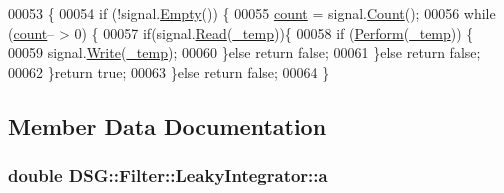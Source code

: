 \begin{DoxyCode}
00053                                                                           \{
00054             \textcolor{keywordflow}{if} (!signal.\hyperlink{class_d_s_g_1_1_ring_buffer_ac1346f5842d08b988a5297abe4089b96}{Empty}()) \{
00055                 \hyperlink{class_d_s_g_1_1_filter_1_1_filter_base_a74068413169f9acb3fcf8276074e3b1d}{count} = signal.\hyperlink{class_d_s_g_1_1_ring_buffer_a9bd79b0a6dff618b205e396c101ee070}{Count}();
00056                 \textcolor{keywordflow}{while} (\hyperlink{class_d_s_g_1_1_filter_1_1_filter_base_a74068413169f9acb3fcf8276074e3b1d}{count}-- > 0) \{
00057                     \textcolor{keywordflow}{if}(signal.\hyperlink{class_d_s_g_1_1_ring_buffer_a6b2848a64f15c7b0c320779582fa0fbe}{Read}(\hyperlink{class_d_s_g_1_1_filter_1_1_filter_base_a9e21e909fa2989adb88eedcb194e0150}{\_temp}))\{
00058                         \textcolor{keywordflow}{if} (\hyperlink{class_d_s_g_1_1_filter_1_1_leaky_integrator_a14ffd2f68de0cb9941d3295307ef13f0}{Perform}(\hyperlink{class_d_s_g_1_1_filter_1_1_filter_base_a9e21e909fa2989adb88eedcb194e0150}{\_temp})) \{
00059                             signal.\hyperlink{class_d_s_g_1_1_ring_buffer_aa5dd2caa0a270173251faee40a43d692}{Write}(\hyperlink{class_d_s_g_1_1_filter_1_1_filter_base_a9e21e909fa2989adb88eedcb194e0150}{\_temp});
00060                         \}\textcolor{keywordflow}{else} \textcolor{keywordflow}{return} \textcolor{keyword}{false};
00061                     \}\textcolor{keywordflow}{else} \textcolor{keywordflow}{return} \textcolor{keyword}{false};
00062                 \}\textcolor{keywordflow}{return} \textcolor{keyword}{true};
00063             \}\textcolor{keywordflow}{else} \textcolor{keywordflow}{return} \textcolor{keyword}{false};
00064         \}
\end{DoxyCode}


\subsection{Member Data Documentation}
\hypertarget{class_d_s_g_1_1_filter_1_1_leaky_integrator_a9a321b7650923119fda60595a7659aef}{
\subsubsection[{a}]{\setlength{\rightskip}{0pt plus 5cm}double D\+S\+G\+::\+Filter\+::\+Leaky\+Integrator\+::a\hspace{0.3cm}{\ttfamily [protected]}}}\label{class_d_s_g_1_1_filter_1_1_leaky_integrator_a9a321b7650923119fda60595a7659aef}


